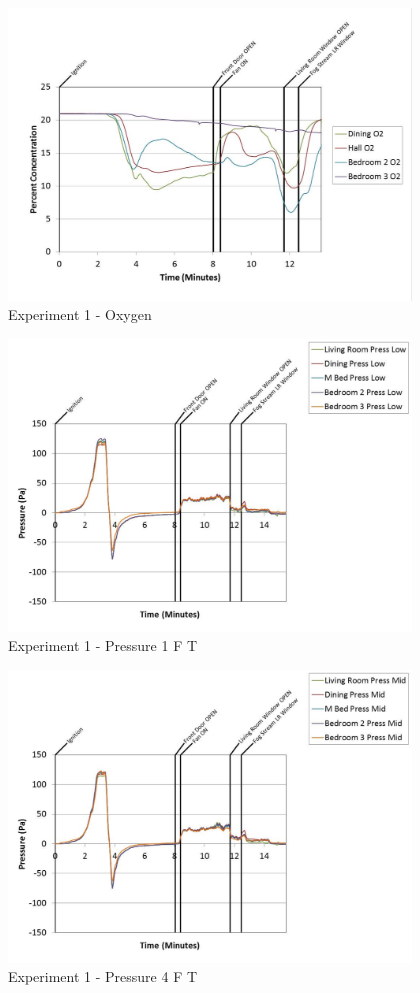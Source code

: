 \documentclass{article}
\begin{document}
\begin{appendices}
	\begin{figure}[h!]
		\centering
		\includegraphics[height=3.05in]{0_Images/Results_Charts/Exp_1_Charts/Oxygen.pdf}
		\caption{Experiment 1 - Oxygen}
	\end{figure}
 
	\clearpage

	\begin{figure}[h!]
		\centering
		\includegraphics[height=3.05in]{0_Images/Results_Charts/Exp_1_Charts/Pressure1FT.pdf}
		\caption{Experiment 1 - Pressure 1 F T}
	\end{figure}
 

	\begin{figure}[h!]
		\centering
		\includegraphics[height=3.05in]{0_Images/Results_Charts/Exp_1_Charts/Pressure4FT.pdf}
		\caption{Experiment 1 - Pressure 4 F T}
	\end{figure}
 

\end{appendices}
\end{document}
